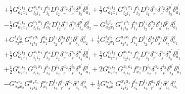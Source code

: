 \documentclass[aip,onecolumn,preprint]{revtex4-1}
\begin{document}
\begin{align}
  & + {{{\frac{1}{2}}}{G^{{i_2}{i_5}}_{{a_2}{x_1}}}{G^{{x_1}{a_1}}_{{i_3}{i_4}}}{f^{{i_3}}_{{i_1}}}{D^{{i_1}}_{{i_2}}}{\delta^{{a_2}}_{r^\prime}}{\delta^{{i_4}}_{s^\prime}}{\delta^{p^\prime}_{{i_5}}}{\delta^{q^\prime}_{{a_1}}}} + {{{\frac{1}{2}}}{G^{{i_3}{i_5}}_{{a_2}{x_1}}}{G^{{a_1}{x_1}}_{{i_2}{i_4}}}{f^{{i_1}}_{{i_3}}}{D^{{i_2}}_{{i_1}}}{\delta^{{i_4}}_{r^\prime}}{\delta^{{a_2}}_{s^\prime}}{\delta^{p^\prime}_{{i_5}}}{\delta^{q^\prime}_{{a_1}}}} \nonumber \\
  & - {{{\frac{1}{2}}}{G^{{i_4}{i_2}}_{{a_3}{x_1}}}{G^{{a_1}{x_1}}_{{i_1}{i_3}}}{f^{{a_2}}_{{a_1}}}{D^{{i_1}}_{{i_2}}}{\delta^{{a_3}}_{r^\prime}}{\delta^{{i_3}}_{s^\prime}}{\delta^{p^\prime}_{{i_4}}}{\delta^{q^\prime}_{{a_2}}}} - {{G^{{i_5}{i_2}}_{{a_2}{x_1}}}{G^{{x_1}{a_1}}_{{i_1}{i_3}}}{f^{{i_3}}_{{i_4}}}{D^{{i_1}}_{{i_2}}}{\delta^{{a_2}}_{r^\prime}}{\delta^{{i_4}}_{s^\prime}}{\delta^{p^\prime}_{{i_5}}}{\delta^{q^\prime}_{{a_1}}}} \nonumber \\
  & + {{G^{{i_4}{i_2}}_{{a_3}{x_1}}}{G^{{x_1}{a_1}}_{{i_1}{i_3}}}{f^{{a_2}}_{{a_1}}}{D^{{i_1}}_{{i_2}}}{\delta^{{a_3}}_{r^\prime}}{\delta^{{i_3}}_{s^\prime}}{\delta^{p^\prime}_{{i_4}}}{\delta^{q^\prime}_{{a_2}}}} + {{{\frac{1}{2}}}{G^{{i_2}{i_5}}_{{a_2}{x_1}}}{G^{{a_1}{x_1}}_{{i_3}{i_4}}}{f^{{i_3}}_{{i_1}}}{D^{{i_1}}_{{i_2}}}{\delta^{{i_4}}_{r^\prime}}{\delta^{{a_2}}_{s^\prime}}{\delta^{p^\prime}_{{i_5}}}{\delta^{q^\prime}_{{a_1}}}} \nonumber \\
  & + {{{\frac{1}{2}}}{G^{{i_2}{i_3}}_{{a_2}{x_1}}}{G^{{x_1}{a_1}}_{{i_1}{i_5}}}{f^{{i_4}}_{{i_3}}}{D^{{i_1}}_{{i_2}}}{\delta^{{a_2}}_{r^\prime}}{\delta^{{i_5}}_{s^\prime}}{\delta^{p^\prime}_{{i_4}}}{\delta^{q^\prime}_{{a_1}}}} 
  + {{{\frac{1}{2}}}{G^{{i_3}{i_5}}_{{a_2}{x_1}}}{G^{{x_1}{a_1}}_{{i_2}{i_4}}}{f^{{i_1}}_{{i_3}}}{D^{{i_2}}_{{i_1}}}{\delta^{{a_2}}_{r^\prime}}{\delta^{{i_4}}_{s^\prime}}{\delta^{p^\prime}_{{i_5}}}{\delta^{q^\prime}_{{a_1}}}} \nonumber \\
  & + {{{\frac{1}{2}}}{G^{{i_3}{i_2}}_{{a_2}{x_1}}}{G^{{a_1}{x_1}}_{{i_1}{i_5}}}{f^{{i_4}}_{{i_3}}}{D^{{i_1}}_{{i_2}}}{\delta^{{a_2}}_{r^\prime}}{\delta^{{i_5}}_{s^\prime}}{\delta^{p^\prime}_{{i_4}}}{\delta^{q^\prime}_{{a_1}}}} + {{{2}}{G^{{i_4}{i_2}}_{{a_2}{x_2}}}{G^{{x_1}{a_1}}_{{i_1}{i_3}}}{f^{{x_2}}_{{x_1}}}{D^{{i_1}}_{{i_2}}}{\delta^{{a_2}}_{r^\prime}}{\delta^{{i_3}}_{s^\prime}}{\delta^{p^\prime}_{{i_4}}}{\delta^{q^\prime}_{{a_1}}}} \nonumber \\
  & - {{G^{{i_2}{i_4}}_{{a_2}{x_2}}}{G^{{a_1}{x_1}}_{{i_1}{i_3}}}{f^{{x_2}}_{{x_1}}}{D^{{i_1}}_{{i_2}}}{\delta^{{i_3}}_{r^\prime}}{\delta^{{a_2}}_{s^\prime}}{\delta^{p^\prime}_{{i_4}}}{\delta^{q^\prime}_{{a_1}}}} + {{{\frac{1}{2}}}{G^{{i_2}{i_5}}_{{a_2}{x_1}}}{G^{{x_1}{a_1}}_{{i_1}{i_3}}}{f^{{i_3}}_{{i_4}}}{D^{{i_1}}_{{i_2}}}{\delta^{{a_2}}_{r^\prime}}{\delta^{{i_4}}_{s^\prime}}{\delta^{p^\prime}_{{i_5}}}{\delta^{q^\prime}_{{a_1}}}} \nonumber \\

\end{align}
\end{document}
